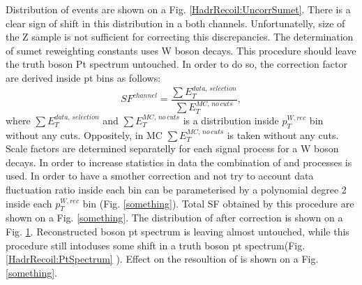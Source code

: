 Distribution of \sumet  events are shown on a Fig. \ref{HadrRecoil:UncorrSumet}. There is a clear sign of shift in this distribution in a both channels. Unfortunatelly, size of the Z sample is not sufficient for correcting this discrepancies. 
The determination of sumet reweighting constants uses W boson decays. This procedure should leave the truth boson Pt spectrum untouched. In order to do so, the correction factor are derived inside pt bins as follows:
\begin{equation}
SF^{channel}=\frac{\sum E_T^{data,\, selection} }{\sum E_T^{MC,\, no\, cuts} },
\end{equation}
where $\sum E_T^{data,\, selection} $ and $\sum E_T^{MC,\, no\, cuts}$ is a \sumet distribution inside $p_T^{W, rec}$ bin without any cuts. Oppositely, in MC $\sum E_T^{MC,\, no\, cuts} $ is taken without any cuts. Scale factors are determined separatelly for each signal process for a W boson decays.  In order to increase statistics in data the combination of \wenu and \wmunu processes is used.  In order to have a smother correction and not try to account data fluctuation ratio inside each bin can be parameterised by a polynomial degree   2 inside each $p_T^{W, rec}$ bin (Fig. \ref{something}).  Total SF obtained by this procedure are shown on a Fig. \ref{something}. The distribution of \sumet after correction is shown on a Fig. \ref{HadrRecoil:CorrSumet}. Reconstructed boson pt spectrum is leaving almost untouched, while this procedure still intoduses some shift in a truth boson pt spectrum(Fig. \ref{HadrRecoil:PtSpectrum} ). Effect on the resoultion of \uperp is shown on a Fig. \ref{something}.

\begin{figure}[h]
\begin{minipage}[h]{0.40\linewidth}
\end{minipage}
\hfill
\begin{minipage}[h]{0.40\linewidth}
\end{minipage}
\label{HadrRecoil:UncorrSumet}
\vfill
\begin{minipage}[h]{0.40\linewidth}
\end{minipage}
\hfill
\begin{minipage}[h]{0.40\linewidth}
\end{minipage}
\caption{}
\label{HadrRecoil:CorrSumet}
\end{figure}


